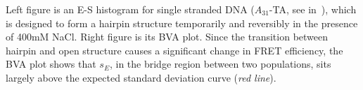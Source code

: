 \label{fig:bva_dynamic} Left figure is an E-S histogram for single stranded DNA ($A_{31}$-TA, see in~\cite{Tsukanov_2013}), which is designed to form a hairpin structure temporarily and reversibly in the presence of 400mM NaCl. Right figure is its BVA plot. Since the transition between hairpin and open structure causes a significant change in FRET efficiency, the BVA plot shows that $s_E$, in the bridge region between two populations, sits largely above the expected standard deviation curve (\textit{red line}).